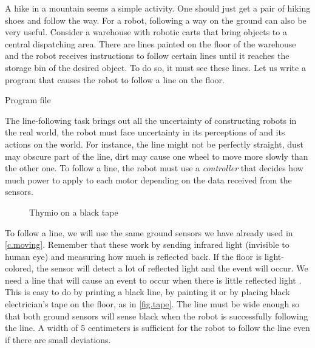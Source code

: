 \label{ch.line}

A hike in a mountain seems a simple activity.
One should just get a pair of hiking shoes and follow the way.
For a robot, following a way on the ground can also be very useful.
Consider a warehouse with robotic carts that bring objects to a central dispatching area.
There are lines painted on the floor of the warehouse and the robot receives instructions to follow
certain lines until it reaches the storage bin of the desired object.
To do so, it must see these lines.
Let us write a program that causes the robot to follow a line on the floor.

{\raggedleft \hfill Program file }

The line-following task brings out all the uncertainty of constructing
robots in the real world, the robot must face uncertainty in its perceptions of and its actions on the world.
For instance, the line might not be perfectly straight, dust may obscure part of the line, dirt may cause one wheel to move more slowly than the other one.
To follow a line, the robot must use a
\emph{controller} that decides how much power to apply to each motor
depending on the data received from the sensors.


\begin{figure}
	\hfill
	\caption{Thymio on a black tape}
\end{figure}

To follow a line, we will use the same ground sensors we have already used in \cref{c.moving}.
Remember that these work by sending infrared light (invisible to human eye) and measuring how much is reflected back.
If the floor is light-colored, the sensor will detect a lot of reflected
light and the event  will occur. We need a line
that will cause an event to occur when there is little reflected light
. This is easy to do by printing a black line, by painting it or by placing black
electrician's tape on the floor, as in \cref{fig.tape}. The line must
be wide enough so that both ground sensors will sense black when the
robot is successfully following the line. A width of 5
centimeters is sufficient for the robot to follow the line even if there
are small deviations.

